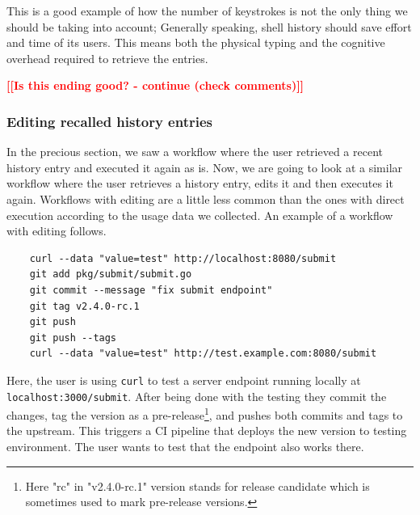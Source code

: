 \documentclass[thesis=M,english]{FITthesis}[2012/10/20]
\newcommand{\todotext}[1]{\textcolor{red}{\textbf{[[#1]]}}}
\begin{document}
This is a good example of how the number of keystrokes is not the only thing we should be taking into account; Generally speaking, shell history should save effort and time of its users. This means both the physical typing and the cognitive overhead required to retrieve the entries.


\todotext{Is this ending good? - continue (check comments)}



\subsubsection*{Editing recalled history entries}

In the precious section, we saw a workflow where the user retrieved a recent history entry and executed it again as is. Now, we are going to look at a similar workflow where the user retrieves a history entry, edits it and then executes it again. Workflows with editing are a little less common than the ones with direct execution according to the usage data we collected. An example of a workflow with editing follows.

\begin{verbatim}
    curl --data "value=test" http://localhost:8080/submit
    git add pkg/submit/submit.go
    git commit --message "fix submit endpoint"
    git tag v2.4.0-rc.1
    git push
    git push --tags
    curl --data "value=test" http://test.example.com:8080/submit
\end{verbatim}

Here, the user is using \verb|curl| to test a server endpoint running locally at \verb|localhost:3000/submit|.  After being done with the testing they commit the changes, tag the version as a pre-release\footnote{Here "rc" in "v2.4.0-rc.1" version stands for release candidate which is sometimes used to mark pre-release versions.}, and pushes both commits and tags to the upstream. This triggers a CI pipeline that deploys the new version to testing environment. The user wants to test that the endpoint also works there.
\end{document}
